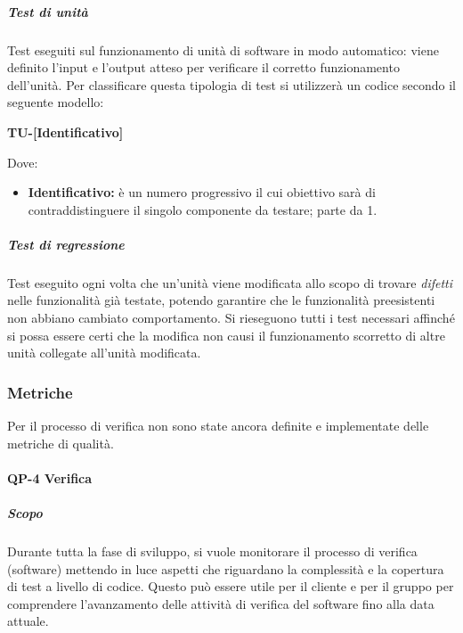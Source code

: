                     \subparagraph*{Test di unità}
                            Test eseguiti sul funzionamento di unità di software in modo automatico: viene definito l'input e l'output atteso per verificare il corretto funzionamento dell'unità.
                            Per classificare questa tipologia di test si utilizzerà un codice secondo il seguente modello:     

                            \begin{center}
                            	\textbf{TU-[Identificativo]}
                            \end{center}
                            Dove:
                            
							\begin{itemize}
                            	\item \textbf{Identificativo:} è un numero progressivo il cui obiettivo sarà di contraddistinguere il singolo componente da testare; parte da 1.
							\end{itemize}
						
                    \subparagraph*{Test di regressione}
        				Test eseguito ogni volta che un'unità viene modificata allo scopo di trovare \textit{difetti} nelle funzionalità già testate, potendo garantire che le funzionalità preesistenti non abbiano cambiato comportamento. Si rieseguono tutti i test necessari affinché si possa essere certi che la modifica non causi il funzionamento scorretto di altre unità collegate all'unità modificata.


    \subsubsection{Metriche}

    Per il processo di verifica non sono state ancora definite e implementate delle metriche di qualità.

    \paragraph{QP-4 Verifica}

        \subparagraph{Scopo}

            Durante tutta la fase di sviluppo, si vuole monitorare il processo di verifica (software) mettendo in luce aspetti che riguardano la complessità e la copertura di test a livello di codice. Questo può essere utile per il cliente e per il gruppo per comprendere l'avanzamento delle attività di verifica del software fino alla data attuale.

